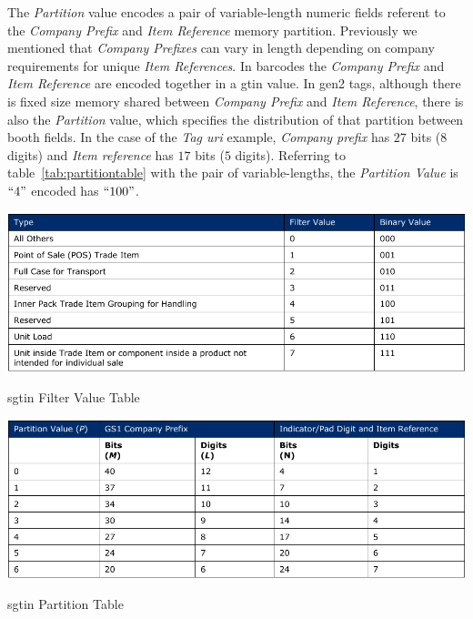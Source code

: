 The \emph{Partition} value encodes a pair of variable-length numeric fields referent to the \emph{Company Prefix} and \emph{Item Reference} memory partition. Previously we mentioned that \emph{Company Prefixes} can vary in length depending on company requirements for unique \emph{Item References}. 
In barcodes the \emph{Company Prefix} and \emph{Item Reference} are encoded together in a \ac{gtin} value. 
In \ac{gen2} tags, although there is fixed size memory shared between \emph{Company Prefix} and \emph{Item Reference}, there is also the \emph{Partition} value, which specifies the distribution of that partition between booth fields.
In the case of the \emph{Tag \ac{uri}} example, \emph{Company prefix} has $27$ bits ($8$ digits) and \emph{Item reference} has $17$ bits ($5$ digits). Referring to table~\ref{tab:partitiontable} with the pair of variable-lengths, the \emph{Partition Value} is $``4"$ encoded has $``100"$.

\begin{table}[]
    \centering
    \includegraphics[width=\textwidth]{./figs/02-state-of-the-art/table_sgtin_filtervalues.pdf}
    \caption{\ac{sgtin} Filter Value Table~\cite{EPCTagData}} 
    \label{tab:sgtinfiltervalues}
\end{table}

\begin{table}[]
    \centering
    \includegraphics[width=\textwidth]{./figs/02-state-of-the-art/table_partitionvalues.pdf}
    \caption{\ac{sgtin} Partition Table~\cite{EPCTagData}} 
    \label{tab:partitiontable}
\end{table}

